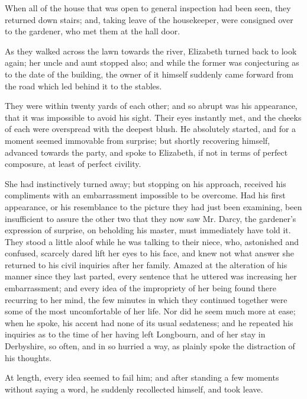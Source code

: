 \documentclass[12pt]{book}
\begin{document}
When all of the house that was open to general inspection had been seen, they returned down stairs; and, taking leave of the housekeeper, were consigned over to the gardener, who met them at the hall door.

As they walked across the lawn towards the river, Elizabeth turned back to look again; her uncle and aunt stopped also; and while the former was conjecturing as to the date of the building, the owner of it himself suddenly came forward from the road which led behind it to the stables.

They were within twenty yards of each other; and so abrupt was his appearance, that it was impossible to avoid his sight. Their eyes instantly met, and the cheeks of each were overspread with the deepest blush. He absolutely started, and for a moment seemed immovable from surprise; but shortly recovering himself, advanced towards the party, and spoke to Elizabeth, if not in terms of perfect composure, at least of perfect civility.

She had instinctively turned away; but stopping on his approach, received his compliments with an embarrassment impossible to be overcome. Had his first appearance, or his resemblance to the picture they had just been examining, been insufficient to assure the other two that they now saw Mr. Darcy, the gardener's expression of surprise, on beholding his master, must immediately have told it. They stood a little aloof while he was talking to their niece, who, astonished and confused, scarcely dared lift her eyes to his face, and knew not what answer she returned to his civil inquiries after her family. Amazed at the alteration of his manner since they last parted, every sentence that he uttered was increasing her embarrassment; and every idea of the impropriety of her being found there recurring to her mind, the few minutes in which they continued together were some of the most uncomfortable of her life. Nor did he seem much more at ease; when he spoke, his accent had none of its usual sedateness; and he repeated his inquiries as to the time of her having left Longbourn, and of her stay in Derbyshire, so often, and in so hurried a way, as plainly spoke the distraction of his thoughts.

At length, every idea seemed to fail him; and after standing a few moments without saying a word, he suddenly recollected himself, and took leave.
\end{document}
